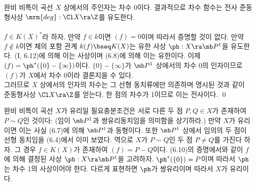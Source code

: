 	
	\begin{corollary}
	완비 비특이 곡선 $X$ 상에서의 주인자는 차수 0이다. 결과적으로 차수 함수는 전사 준동형사상 $\mrm{deg}:\Cl X\ra\Z$를 유도한다.\\\\
	\pf $f\in K(X)^*$라 하자. 만약 $f\in k$이면 $(f)=0$이며 따라서 증명할 것이 없다.
	만약 $f\notin k$이면 체의 포함 관계 $k(f)\bseq K(X)$는 유한 사상 $\ph:X\ra\mb P^1$을 유도한다.
	(I, 6.12)에 의해 이는 사상이며 (6.8)에 의해 이는 유한이다. 이제 $(f)=\ph^*(\{0\}-\{\infty\})$이다.
	$\{0\}-\{\infty\}$가 $\mb P^1$ 상에서의 차수 0의 인자이므로  $(f)$가 $X$에서 차수 0이라 결론지을 수 있다.\\
	그러므로 $X$ 상에서의 인자의 차수는 그 선형 동치류에만 의존하며 명시된 것과 같이 준동형사상 $\Cl X\ra\Z$를 얻는다.
	한 점의 차수가 1이므로 이는 전사이다.
	\qed
	\end{corollary}
	
	
	\begin{example}
	완비 비특이 곡선 $X$가 유리일 필요충분조건은 서로 다른 두 점 $P,Q\in X$가 존재하여 $P\sim Q$인 것이다:
	(임이 $\mb P^1$과 쌍유리동치임을 의미함을 상기하라.)
	만약 $X$가 유리이면 이는 사실 (6.7)에 의해 $\mb P^1$과 동형이다.
	또한 $\mb P^1$ 상에서 임의의 두 점이 선형 동치임을 (6.4)에서 이미 보였다.
	역으로 $X$가 $P\sim Q$인 두 점 $P\ne Q$를 가진다 하자. 그 경우 $f\in K(X)$가 존재하여 $(f)=P-Q$이다.
	(6.10)의 증명에서와 같이 $f$에 의해 결정된 사상 $\ph:X\ra\mb P^1$을 고려하자.
	$\ph^*(\{0\})=P$이며 따라서 $\ph$는 차수 1의 사상이어야 한다. 다르게 표현하면 $\ph$가 쌍유리이며 따라서 $X$가 유리이다.
	\end{example}
	
